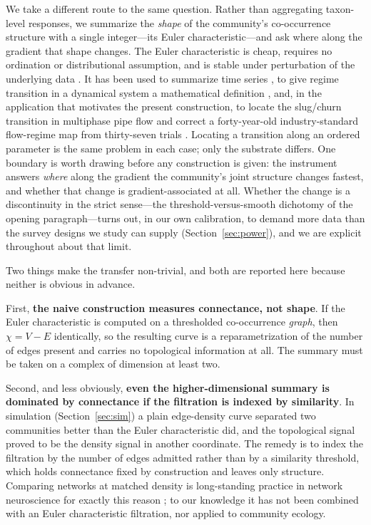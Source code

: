 \documentclass[review,12pt,authoryear]{elsarticle}
\theoremstyle{remark}
\begin{document}
We take a different route to the same question. Rather than aggregating
taxon-level responses, we summarize the \emph{shape} of the community's
co-occurrence structure with a single integer---its Euler characteristic---and ask where along the gradient that shape changes. The Euler characteristic is
cheap, requires no ordination or distributional assumption, and is stable under
perturbation of the underlying data \citep{dlotko2023eulercurves}. It has been
used to summarize time series \citep{sharma2026ecs}, to give regime transition
in a dynamical system a mathematical definition \citep{majhi2026regime}, and, in
the application that motivates the present construction, to locate the
slug/churn transition in multiphase pipe flow and correct a
forty-year-old industry-standard flow-regime map from thirty-seven trials
\citep{koenig2026churn}. Locating a transition along an ordered parameter is the
same problem in each case; only the substrate differs. One boundary is worth
drawing before any construction is given: the instrument answers \emph{where}
along the gradient the community's joint structure changes fastest, and
whether that change is gradient-associated at all. Whether the change is a
discontinuity in the strict sense---the threshold-versus-smooth dichotomy
of the opening paragraph---turns out, in our own calibration, to demand
more data than the survey designs we study can supply
(Section~\ref{sec:power}), and we are explicit throughout about that limit.

Two things make the transfer non-trivial, and both are reported here because
neither is obvious in advance.

First, \textbf{the naive construction measures connectance, not shape}. If the
Euler characteristic is computed on a thresholded co-occurrence \emph{graph},
then $\chi = V - E$ identically, so the resulting curve is a reparametrization
of the number of edges present and carries no topological information at all.
The summary must be taken on a complex of dimension at least two.

Second, and less obviously, \textbf{even the higher-dimensional summary is
dominated by connectance if the filtration is indexed by similarity}. In
simulation (Section~\ref{sec:sim}) a plain edge-density curve separated two
communities better than the Euler characteristic did, and the topological
signal proved to be the density signal in another coordinate. The remedy is to
index the filtration by the number of edges admitted rather than by a similarity
threshold, which holds connectance fixed by construction and leaves only
structure. Comparing networks at matched density is long-standing practice in
network neuroscience for exactly this reason
\citep{achard2006resilient,vanwijk2010density}; to our knowledge it has not been
combined with an Euler characteristic filtration, nor applied to community
ecology.
\end{document}
